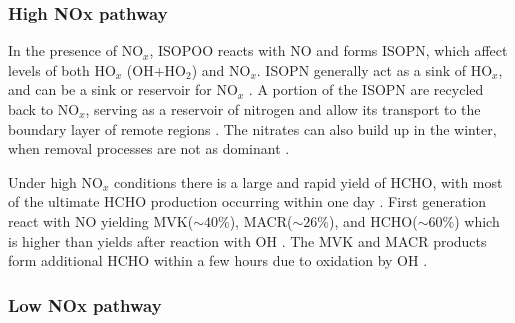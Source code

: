     
      
      
    \subsubsection{High NOx pathway}
      In the presence of NO$_x$, ISOPOO reacts with NO and forms ISOPN, which affect levels of both HO$_x$ (OH+HO$_2$) and NO$_x$.
      ISOPN generally act as a sink of HO$_x$, and can be a sink or reservoir for NO$_x$ \parencite[][]{Mao2013, Fisher2016}. 
      A portion of the ISOPN are recycled back to NO$_x$, serving as a reservoir of nitrogen and allow its transport to the boundary layer of remote regions \parencite{Patchen2007, Paulot2009a}.
      The nitrates can also build up in the winter, when removal processes are not as dominant \parencite{Lelieveld2009}.
      
      Under high NO$_x$ conditions there is a large and rapid yield of HCHO, with most of the ultimate HCHO production occurring within one day \parencite{Palmer2006}.
      First generation \roo react with NO yielding MVK($\sim 40\%$), MACR($\sim 26\%$), and HCHO($\sim 60\%$) which is higher than yields after reaction with OH \parencite{Liu2013, Mao2013}.
      The MVK and MACR products form additional HCHO within a few hours due to oxidation by OH \parencite{Palmer2006}.
      
      
      
    
    \subsubsection{Low NOx pathway}
      

